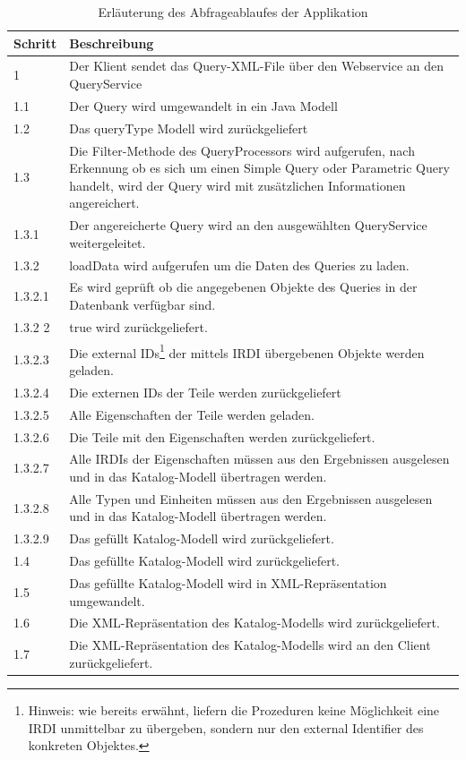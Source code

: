 \begin{table}[!hbt]\vspace{1ex}\centering\begin{tabular}{p{3cm}p{10cm}}
\hline
Schritt & Beschreibung\\
\hline
\hline
1 &  Der Klient sendet das Query-XML-File über den Webservice an den QueryService \\
\hline
1.1 &  Der Query wird umgewandelt in ein Java Modell \\
\hline
1.2 &  Das queryType Modell wird zurückgeliefert \\
\hline
1.3 &  Die Filter-Methode des QueryProcessors wird aufgerufen, nach Erkennung ob es sich um einen Simple Query oder Parametric Query handelt, wird der Query wird mit zusätzlichen Informationen angereichert. \\
\hline
1.3.1 &  Der angereicherte Query wird an den ausgewählten QueryService weitergeleitet.  \\
\hline
1.3.2 &  loadData wird aufgerufen um die Daten des Queries zu laden. \\
\hline
1.3.2.1 &  Es wird geprüft ob die angegebenen Objekte des Queries in der Datenbank verfügbar sind. \\
\hline
1.3.2 2 &  true wird zurückgeliefert. \\
\hline
1.3.2.3 &  Die external IDs\footnote{Hinweis: wie bereits erwähnt, liefern die Prozeduren keine Möglichkeit eine IRDI unmittelbar zu übergeben, sondern nur den external Identifier des konkreten Objektes.} der mittels IRDI übergebenen Objekte werden geladen. \\
\hline
1.3.2.4 &  Die externen IDs der Teile werden zurückgeliefert \\
\hline
1.3.2.5 &  Alle Eigenschaften der Teile werden geladen.  \\
\hline
1.3.2.6 &  Die Teile mit den Eigenschaften werden zurückgeliefert. \\
\hline
1.3.2.7 &  Alle IRDIs der Eigenschaften müssen aus den Ergebnissen ausgelesen und in das Katalog-Modell übertragen werden. \\
\hline
1.3.2.8 &  Alle Typen und Einheiten müssen aus den Ergebnissen ausgelesen und in das Katalog-Modell übertragen werden. \\
1.3.2.9 &  Das gefüllt Katalog-Modell wird zurückgeliefert. \\
\hline
1.4 &  Das gefüllte Katalog-Modell wird zurückgeliefert. \\
\hline
1.5 &  Das gefüllte Katalog-Modell wird in XML-Repräsentation umgewandelt. \\
\hline
1.6 &  Die XML-Repräsentation des Katalog-Modells wird zurückgeliefert. \\
\hline
1.7 &  Die XML-Repräsentation des Katalog-Modells wird an den Client zurückgeliefert. \\
\hline
\end{tabular}
\caption{\label{tab.abfrageablauf}Erläuterung des Abfrageablaufes der Applikation}
\vspace{2ex}\end{table}
 

